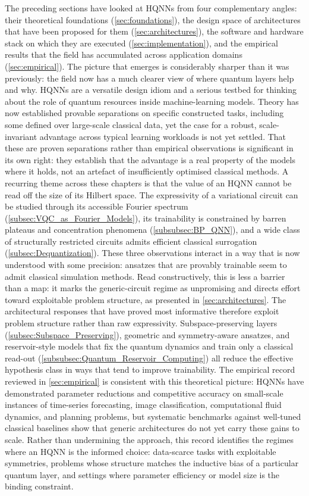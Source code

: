 \documentclass[aps,10pt,groupedaddress,prx,superscriptaddress,twocolumn,balancelastpage, tightenlines]{revtex4-2}
\theoremstyle{plain}  %
\begin{document}
The preceding sections have looked at \glspl{HQNN} from four complementary angles: their theoretical foundations (\autoref{sec:foundations}), the design space of architectures that have been proposed for them (\autoref{sec:architectures}), the software and hardware stack on which they are executed (\autoref{sec:implementation}), and the empirical results that the field has accumulated across application domains (\autoref{sec:empirical}). The picture that emerges is considerably sharper than it was previously: the field now has a much clearer view of where quantum layers help and why.  \glspl{HQNN} are a versatile design idiom and a serious testbed for thinking about the role of quantum resources inside machine-learning models. Theory has now established provable separations on specific constructed tasks, including some defined over large-scale classical data, yet the case for a robust, scale-invariant advantage across typical learning workloads is not yet settled. That these are proven separations rather than empirical observations is significant in its own right: they establish that the advantage is a real property of the models where it holds, not an artefact of insufficiently optimised classical methods. A recurring theme across these chapters is that the value of an \gls{HQNN} cannot be read off the size of its Hilbert space. The expressivity of a variational circuit can be studied through its accessible Fourier spectrum (\autoref{subsec:VQC_as_Fourier_Models}), its trainability is constrained by barren plateaus and concentration phenomena (\autoref{subsubsec:BP_QNN}), and a wide class of structurally restricted circuits admits efficient classical surrogation (\autoref{subsec:Dequantization}). These three observations interact in a way that is now understood with some precision: ansatzes that are provably trainable seem to admit classical simulation methods. Read constructively, this is less a barrier than a map: it marks the generic-circuit regime as unpromising and directs effort toward exploitable problem structure, as presented in \autoref{sec:architectures}. The architectural responses that have proved most informative therefore exploit problem structure rather than raw expressivity. Subspace-preserving layers (\autoref{subsec:Subspace_Preserving}), geometric and symmetry-aware ansatzes, and reservoir-style models that fix the quantum dynamics and train only a classical read-out (\autoref{subsubsec:Quantum_Reservoir_Computing}) all reduce the effective hypothesis class in ways that tend to improve trainability. The empirical record reviewed in \autoref{sec:empirical} is consistent with this theoretical picture: \glspl{HQNN} have demonstrated parameter reductions and competitive accuracy on small-scale instances of time-series forecasting, image classification, computational fluid dynamics, and planning problems, but systematic benchmarks against well-tuned classical baselines show that generic architectures do not yet carry these gains to scale. Rather than undermining the approach, this record identifies the regimes where an \gls{HQNN} is the informed choice: data-scarce tasks with exploitable symmetries, problems whose structure matches the inductive bias of a particular quantum layer, and settings where parameter efficiency or model size is the binding constraint.
\end{document}
